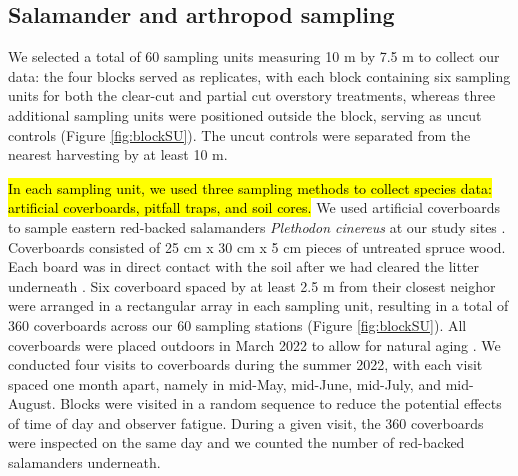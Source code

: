 \subsection*{Salamander and arthropod sampling}
\label{subsec:sampling}

We selected a total of 60 sampling units measuring 10 m by 7.5 m to collect our data: the four blocks served as replicates, 
with each block containing six sampling units for both the clear-cut and partial cut overstory treatments, 
whereas three additional sampling units were positioned outside the block, serving as uncut controls (Figure \ref*{fig:blockSU}). 
The uncut controls were separated from the nearest harvesting by at least 10 m.

\hl{In each sampling unit, we used three sampling methods to collect species data: artificial coverboards, pitfall traps, and soil cores.}
We used artificial coverboards to sample eastern red-backed salamanders \textit{Plethodon cinereus} at our study sites \citep{hydeSamplingPlethodontidSalamanders2001,mooreComparisonPopulationEastern2009c,hesedUncoveringSalamanderEcology2012,Mazerolle2021Woodlandsalamander}. 
Coverboards consisted of 25 cm x 30 cm x 5 cm pieces of untreated spruce wood. Each board was in direct contact with the soil after we had cleared the litter underneath \citep{Mazerolle2021Woodlandsalamander}. 
Six coverboard spaced by at least 2.5 m from their closest neighor were arranged in a rectangular array in each sampling unit, resulting in a total of 360 coverboards across our 60 sampling stations (Figure \ref{fig:blockSU}). 
All coverboards were placed outdoors in March 2022 to allow for natural aging \citep{hedrickEffectsCoverboardAge2021,Grasser2014Effectscover}. 
We conducted four visits to coverboards during the summer 2022, with each visit spaced one month apart, namely in mid-May, mid-June, mid-July, and mid-August. 
Blocks were visited in a random sequence to reduce the potential effects of time of day and observer fatigue. 
During a given visit, the 360 coverboards were inspected on the same day and we counted the number of red-backed salamanders underneath. 

